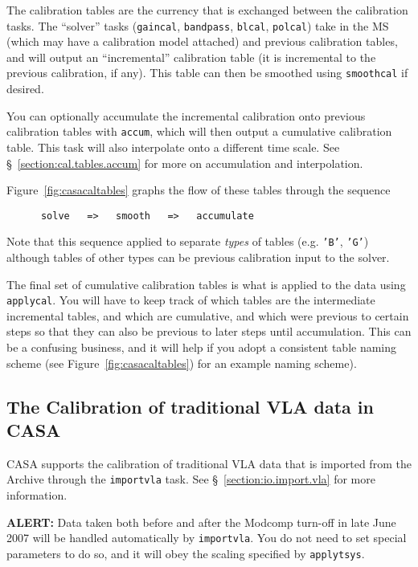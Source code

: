 The calibration tables are the currency that is exchanged between
the calibration tasks.  The ``solver'' tasks ({\tt gaincal},
{\tt bandpass}, {\tt blcal}, {\tt polcal}) take in the MS
(which may have a calibration model attached) and previous calibration
tables, and will output an ``incremental'' calibration table
(it is incremental to the previous calibration, if any).  This table
can then be smoothed using {\tt smoothcal} if desired.

You can optionally accumulate the incremental calibration onto
previous calibration tables with {\tt accum}, which will then output a
cumulative calibration table.  This task will also interpolate onto a
different time scale.  See \S~\ref{section:cal.tables.accum} for more
on accumulation and interpolation.

Figure~\ref{fig:casacaltables} graphs the flow of these tables
through the sequence
\small
\begin{verbatim}
      solve   =>   smooth   =>   accumulate
\end{verbatim}
\normalsize
Note that this sequence applied to separate {\em types} of tables
(e.g. {\tt 'B'}, {\tt 'G'}) although tables of other types can
be previous calibration input to the solver.

The final set of cumulative calibration tables is what is applied
to the data using {\tt applycal}.  You will have to keep track of
which tables are the intermediate incremental tables, and which
are cumulative, and which were previous to certain steps so that
they can also be previous to later steps until accumulation.  This
can be a confusing business, and it will help if you adopt a
consistent table naming scheme (see Figure~\ref{fig:casacaltables})
for an example naming scheme).


\subsection{The Calibration of traditional VLA data in CASA}
\label{section:cal.flow.vla}

CASA supports the calibration of traditional VLA data that is 
imported from the Archive through the {\tt importvla} task.
See \S~\ref{section:io.import.vla} for more information.

{\bf ALERT:} Data taken both before and after the Modcomp turn-off in
late June 2007 will be handled automatically by {\tt importvla}.  You
do not need to set special parameters to do so, and it will obey the
scaling specified by {\tt applytsys}.

